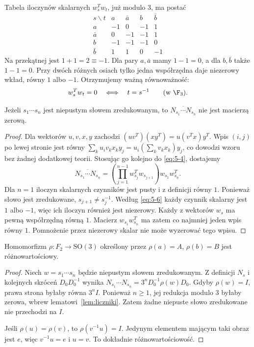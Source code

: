 Tabela iloczynów skalarnych $w_s^Tw_t$, już modulo $3$, ma postać
\begin{equation}\label{eq:5-5}
\begin{array}{c|rrrr}
 s\backslash t&a&\bar a&b&\bar b\\\hline
 a&-1&0&-1&1\\
 \bar a&0&-1&-1&1\\
 b&-1&-1&-1&0\\
 \bar b&1&1&0&-1
\end{array}
\end{equation}
Na przekątnej jest $1+1=2\equiv-1$. Dla pary $a,\bar a$ mamy $1-1=0$, a dla $b,\bar b$ także $1-1=0$. Przy dwóch różnych osiach tylko jedna współrzędna daje niezerowy wkład, równy $1$ albo $-1$. Otrzymujemy ważną równoważność:
\begin{equation}\label{eq:5-6}
 w_s^Tw_t=0\quad\Longleftrightarrow\quad t=s^{-1} \qquad(\text{w }\F_3).
\end{equation}
\begin{lemat}\label{lem:liczniki}
Jeżeli $s_1\cdots s_n$ jest niepustym słowem zredukowanym, to $\overline{N_{s_1}\cdots N_{s_n}}$ nie jest macierzą zerową.
\end{lemat}
\begin{proof}
Dla wektorów $u,v,x,y$ zachodzi $(uv^T)(xy^T)=u(v^Tx)y^T$. Wpis $(i,j)$ po lewej stronie jest równy $\sum_k u_iv_kx_ky_j=u_i(\sum_kv_kx_k)y_j$, co dowodzi wzoru bez żadnej dodatkowej teorii. Stosując go kolejno do \eqref{eq:5-4}, dostajemy
\begin{equation}\label{eq:5-7}
 \overline{N_{s_1}\cdots N_{s_n}}=
 \left(\prod_{j=1}^{n-1}w_{s_j}^Tw_{s_{j+1}}\right)w_{s_1}w_{s_n}^T.
\end{equation}
Dla $n=1$ iloczyn skalarnych czynników jest pusty i z definicji równy $1$. Ponieważ słowo jest zredukowane, $s_{j+1}\ne s_j^{-1}$. Według \eqref{eq:5-6} każdy czynnik skalarny jest $1$ albo $-1$, więc ich iloczyn również jest niezerowy. Każdy z wektorów $w_s$ ma pewną współrzędną równą $1$. Macierz $w_{s_1}w_{s_n}^T$ ma zatem co najmniej jeden wpis równy $1$. Pomnożenie przez niezerowy skalar nie może wyzerować tego wpisu.
\end{proof}
\begin{twierdzenie}\label{tw:wolne-obroty}
Homomorfizm $\rho:F_2\to\mathrm{SO}(3)$ określony przez $\rho(a)=A$, $\rho(b)=B$ jest różnowartościowy.
\end{twierdzenie}
\begin{proof}
Niech $w=s_1\cdots s_n$ będzie niepustym słowem zredukowanym. Z definicji $N_s$ i kolejnych skróceń $D_0D_0^{-1}$ wynika $N_{s_1}\cdots N_{s_n}=3^nD_0^{-1}\rho(w)D_0$. Gdyby $\rho(w)=I$, prawa strona byłaby równa $3^nI$. Ponieważ $n\ge1$, jej redukcja modulo $3$ byłaby zerowa, wbrew lematowi~\ref{lem:liczniki}. Zatem żadne niepuste słowo zredukowane nie przechodzi na $I$.

Jeśli $\rho(u)=\rho(v)$, to $\rho(v^{-1}u)=I$. Jedynym elementem mającym taki obraz jest $e$, więc $v^{-1}u=e$ i $u=v$. To dokładnie różnowartościowość.
\end{proof}
